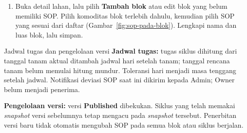\begin{enumerate}[resume=admin-sop]
  \item Buka detail lahan, lalu pilih \textbf{Tambah blok} atau edit blok yang belum memiliki SOP. Pilih komoditas blok terlebih dahulu, kemudian pilih SOP yang sesuai dari daftar (Gambar~\ref{fig:sop-pada-blok}). Lengkapi nama dan luas blok, lalu simpan.
\end{enumerate}


\begin{guidebox}{Jadwal tugas dan pengelolaan versi}
  \textbf{Jadwal tugas:} tugas siklus dihitung dari tanggal tanam aktual ditambah jadwal hari setelah tanam; tanggal rencana tanam belum memulai hitung mundur. Toleransi hari menjadi masa tenggang setelah jadwal. Notifikasi deviasi SOP saat ini dikirim kepada Admin; Owner belum menjadi penerima.

  \textbf{Pengelolaan versi:} versi \textbf{Published} dibekukan. Siklus yang telah memakai \emph{snapshot} versi sebelumnya tetap mengacu pada \emph{snapshot} tersebut. Penerbitan versi baru tidak otomatis mengubah SOP pada semua blok atau siklus berjalan.
\end{guidebox}

